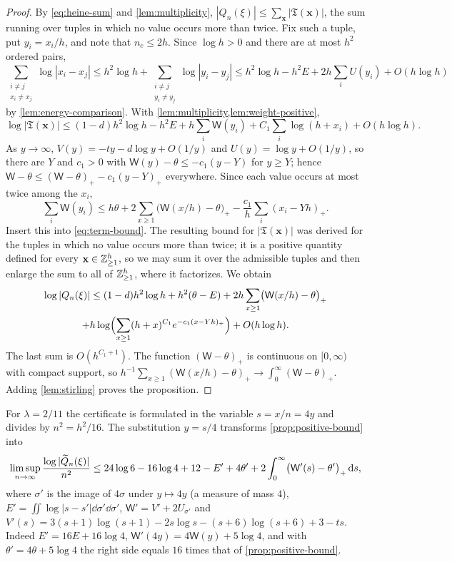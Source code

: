 \begin{proof}
By \eqref{eq:heine-sum} and \cref{lem:multiplicity}, $|Q_n(\xi)|\le\sum_{\mathbf x}|\mathfrak T(\mathbf x)|$, the sum running over tuples in which no value occurs more than twice. Fix such a tuple, put $y_i=x_i/h$, and note that $n_c\le2h$. Since $\log h>0$ and there are at most $h^2$ ordered pairs,
\[
\sum_{\substack{i\ne j\\x_i\ne x_j}}\log|x_i-x_j|\le h^2\log h+\sum_{\substack{i\ne j\\y_i\ne y_j}}\log|y_i-y_j|\le h^2\log h-h^2E+2h\sum_iU(y_i)+O(h\log h)
\]
by \cref{lem:energy-comparison}. With \cref{lem:multiplicity,lem:weight-positive},
\begin{equation}\label{eq:term-bound}
\log|\mathfrak T(\mathbf x)|\le(1-d)h^2\log h-h^2E+h\sum_i\mathsf W(y_i)+C_1\sum_i\log(h+x_i)+O(h\log h).
\end{equation}
As $y\to\infty$, $V(y)=-ty-d\log y+O(1/y)$ and $U(y)=\log y+O(1/y)$, so there are $Y$ and $c_1>0$ with $\mathsf W(y)-\theta\le-c_1(y-Y)$ for $y\ge Y$; hence $\mathsf W-\theta\le(\mathsf W-\theta)_+-c_1(y-Y)_+$ everywhere. Since each value occurs at most twice among the $x_i$,
\[
\sum_i\mathsf W(y_i)\le h\theta+2\sum_{x\ge1}\bigl(\mathsf W(x/h)-\theta\bigr)_+-\frac{c_1}h\sum_i(x_i-Yh)_+ .
\]
Insert this into \eqref{eq:term-bound}. The resulting bound for $|\mathfrak T(\mathbf x)|$ was derived for the tuples in which no value occurs more than twice; it is a positive quantity defined for every $\mathbf x\in\mathbb{Z}_{\ge1}^h$, so we may sum it over the admissible tuples and then enlarge the sum to all of $\mathbb{Z}_{\ge1}^h$, where it factorizes. We obtain
\begin{multline*}
\log|Q_n(\xi)|\le(1-d)h^2\log h+h^2(\theta-E)+2h\sum_{x\ge1}\bigl(\mathsf W(x/h)-\theta\bigr)_+\\
+h\log\Bigl(\sum_{x\ge1}(h+x)^{C_1}e^{-c_1(x-Yh)_+}\Bigr)+O(h\log h).
\end{multline*}
The last sum is $O(h^{C_1+1})$. The function $(\mathsf W-\theta)_+$ is continuous on $[0,\infty)$ with compact support, so $h^{-1}\sum_{x\ge1}(\mathsf W(x/h)-\theta)_+\to\int_0^\infty(\mathsf W-\theta)_+$. Adding \cref{lem:stirling} proves the proposition.
\end{proof}

\begin{remark}[scale for $\lambda=2/11$]\label{rem:211-scale}
For $\lambda=2/11$ the certificate is formulated in the variable $s=x/n=4y$ and divides by $n^2=h^2/16$. The substitution $y=s/4$ transforms \cref{prop:positive-bound} into
\[
\limsup_{n\to\infty}\frac{\log|\widetilde{Q}_n(\xi)|}{n^2}\le24\log6-16\log4+12-E'+4\theta'+2\int_0^\infty\bigl(\mathsf W'(s)-\theta'\bigr)_+\,\mathrm{d} s,
\]
where $\sigma'$ is the image of $4\sigma$ under $y\mapsto4y$ (a measure of mass $4$), $E'=\iint\log|s-s'|\dd\sigma'\dd\sigma'$, $\mathsf W'=V'+2U_{\sigma'}$ and $V'(s)=3(s+1)\log(s+1)-2s\log s-(s+6)\log(s+6)+3-ts$. Indeed $E'=16E+16\log4$, $\mathsf W'(4y)=4\mathsf W(y)+5\log4$, and with $\theta'=4\theta+5\log4$ the right side equals $16$ times that of \cref{prop:positive-bound}.
\end{remark}
